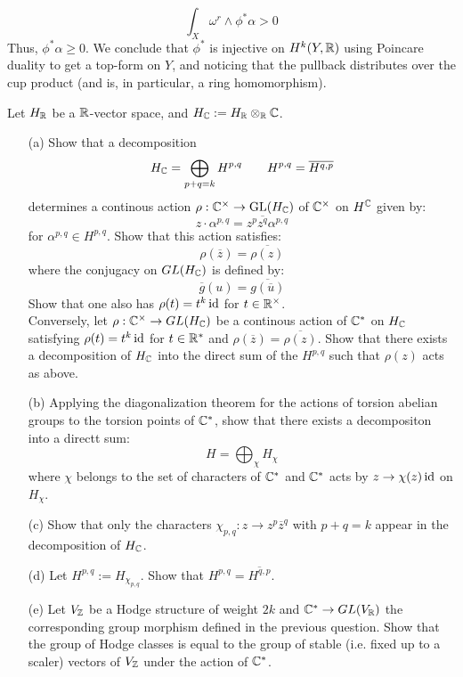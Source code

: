 \documentclass[12pt]{article}
\begin{document}
\begin{solution}
\begin{enumerate}
        \[ \int_X \omega^r \wedge \phi^*\alpha > 0 \]
        Thus, $\phi^* \alpha \geq 0$. We conclude that $\phi^*$ is injective on $H^k(Y, \mathbb R)$ using Poincare duality to get a top-form on $Y$, and noticing that the pullback distributes over the cup product (and is, in particular, a ring homomorphism).      
    \end{enumerate}
\end{solution}


\newpage



\begin{problem}{2.1}
    Let $H_\mathbb R$ be a $\mathbb R$-vector space, and $H_\mathbb C := H_\mathbb R \otimes_\mathbb R \mathbb C$.
    \begin{enumerate}
        \item[(a)] Show that a decomposition
        \[ H_\mathbb C = \bigoplus_{p+q=k} H^{p,q} \qquad H^{p,q} = \overline{H^{q,p}}\]
        determines a continous action $\rho: \mathbb C^\times \to \text{GL}(H_\mathbb C)$ of $\mathbb C^\times$ on $H^\mathbb C$ given by:
        \[ z \cdot \alpha^{p,q} = z^p\overline{z^q}\alpha^{p,q}\]
        for $\alpha^{p,q} \in H^{p,q}$. Show that this action satisfies: 
        \[ \rho(\overline{z}) = \overline{\rho(z)}\]  
        where the conjugacy on $GL(H_\mathbb C)$ is defined by: 
        \[ \overline{g}(u) = \overline{g(\overline u)}\]
        Show that one also has $\rho(t) = t^k \operatorname{id}$ for $t \in \mathbb R^\times$. \\
        Conversely, let $\rho: \mathbb C^\times \to GL(H_\mathbb C)$ be a continous action of $\mathbb C^*$ on $H_\mathbb C$ satisfying $\rho(t) = t^k \operatorname{id}$ for $t \in \mathbb R^*$ and $\rho(\overline{z}) = \overline{\rho(z)}$. Show that there exists a decomposition of $H_\mathbb C$ into the direct sum of the $H^{p,q}$ such that $\rho(z)$ acts as above.
        \item[(b)] Applying the diagonalization theorem for the actions of torsion abelian groups to the torsion points of $\mathbb C^*$, show that there exists a decompositon into a directt sum:
        \[ H = \bigoplus_\chi H_\chi\]
        where $\chi$ belongs to the set of characters of $\mathbb C^*$ and $\mathbb C^*$ acts by $z \to \chi(z)\operatorname{id}$ on $H_\chi$.
        \item[(c)] Show that only the characters $\chi_{p, q}: z \to z^p\overline{z}^q$ with $p+q = k$ appear in the decomposition of $H_\mathbb C$.
        \item[(d)] Let $H^{p,q} := H_{\chi_{p,q}}$. Show that $H^{p, q} = \overline{H^{q, p}}$. 
        \item[(e)] Let $V_\mathbb Z$ be a Hodge structure of weight $2k$ and $\mathbb C^* \to GL(V_\mathbb R)$ the corresponding group morphism defined in the previous question. Show that the group of Hodge classes is equal to the group of stable (i.e. fixed up to a scaler) vectors of $V_\mathbb Z$ under the action of $\mathbb C^*$.
    \end{enumerate}
\end{problem}
\begin{solution}
\end{solution}
\newpage
\end{document}
